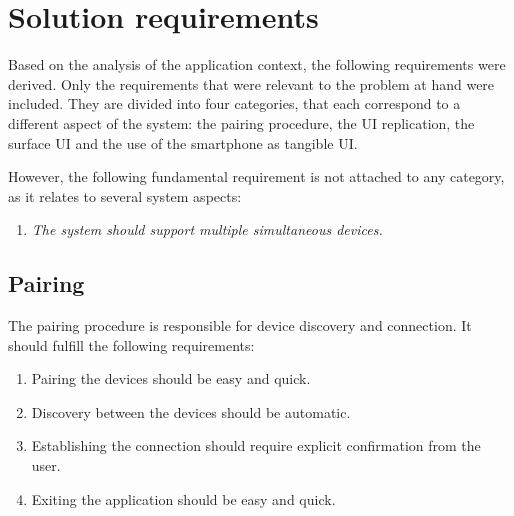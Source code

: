 \section{Solution requirements}
\label{sec:requirements}

Based on the analysis of the application context, the following requirements were derived.
Only the requirements that were relevant to the problem at hand were included.
They are divided into four categories, that each correspond to a different aspect of the system: the pairing procedure, the UI replication, the surface UI and the use of the smartphone as tangible UI.

However, the following fundamental requirement is not attached to any category, as it relates to several system aspects:
\begin{enumerate}[{R}-1]
\item \emph{The system should support multiple simultaneous devices.}
\end{enumerate}

\subsection{Pairing}

The pairing procedure is responsible for device discovery and connection.
It should fulfill the following requirements:

\label{RA}
\begin{enumerate}[{RA}-1]
\item Pairing the devices should be easy and quick.
\item Discovery between the devices should be automatic.
\item Establishing the connection should require explicit confirmation from the user.
\item Exiting the application should be easy and quick.
\end{enumerate}


